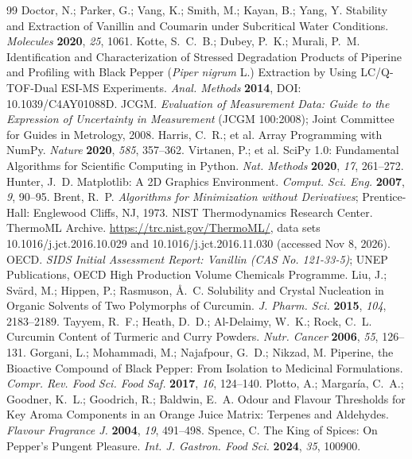 \documentclass[journal=jceaax,manuscript=article,layout=twocolumn]{achemso}
\begin{document}
\begin{thebibliography}{99}
 Doctor, N.; Parker, G.; Vang, K.; Smith, M.; Kayan, B.; Yang, Y. Stability and Extraction of Vanillin and Coumarin under Subcritical Water Conditions. \textit{Molecules} \textbf{2020}, \textit{25}, 1061.
 Kotte, S.~C.~B.; Dubey, P.~K.; Murali, P.~M. Identification and Characterization of Stressed Degradation Products of Piperine and Profiling with Black Pepper (\textit{Piper nigrum} L.) Extraction by Using LC/Q-TOF-Dual ESI-MS Experiments. \textit{Anal. Methods} \textbf{2014}, DOI: 10.1039/C4AY01088D.
 JCGM. \textit{Evaluation of Measurement Data: Guide to the Expression of Uncertainty in Measurement} (JCGM 100:2008); Joint Committee for Guides in Metrology, 2008.
 Harris, C.~R.; et al. Array Programming with NumPy. \textit{Nature} \textbf{2020}, \textit{585}, 357--362.
 Virtanen, P.; et al. SciPy 1.0: Fundamental Algorithms for Scientific Computing in Python. \textit{Nat. Methods} \textbf{2020}, \textit{17}, 261--272.
 Hunter, J.~D. Matplotlib: A 2D Graphics Environment. \textit{Comput. Sci. Eng.} \textbf{2007}, \textit{9}, 90--95.
 Brent, R.~P. \textit{Algorithms for Minimization without Derivatives}; Prentice-Hall: Englewood Cliffs, NJ, 1973.
 NIST Thermodynamics Research Center. ThermoML Archive. \url{https://trc.nist.gov/ThermoML/}, data sets 10.1016/j.jct.2016.10.029 and 10.1016/j.jct.2016.11.030 (accessed Nov 8, 2026).
 OECD. \textit{SIDS Initial Assessment Report: Vanillin (CAS No. 121-33-5)}; UNEP Publications, OECD High Production Volume Chemicals Programme.
 Liu, J.; Sv\"ard, M.; Hippen, P.; Rasmuson, \AA.~C. Solubility and Crystal Nucleation in Organic Solvents of Two Polymorphs of Curcumin. \textit{J. Pharm. Sci.} \textbf{2015}, \textit{104}, 2183--2189.
 Tayyem, R.~F.; Heath, D.~D.; Al-Delaimy, W.~K.; Rock, C.~L. Curcumin Content of Turmeric and Curry Powders. \textit{Nutr. Cancer} \textbf{2006}, \textit{55}, 126--131.
 Gorgani, L.; Mohammadi, M.; Najafpour, G.~D.; Nikzad, M. Piperine, the Bioactive Compound of Black Pepper: From Isolation to Medicinal Formulations. \textit{Compr. Rev. Food Sci. Food Saf.} \textbf{2017}, \textit{16}, 124--140.
 Plotto, A.; Margar\'ia, C.~A.; Goodner, K.~L.; Goodrich, R.; Baldwin, E.~A. Odour and Flavour Thresholds for Key Aroma Components in an Orange Juice Matrix: Terpenes and Aldehydes. \textit{Flavour Fragrance J.} \textbf{2004}, \textit{19}, 491--498.
 Spence, C. The King of Spices: On Pepper's Pungent Pleasure. \textit{Int. J. Gastron. Food Sci.} \textbf{2024}, \textit{35}, 100900.
\end{thebibliography}
\end{document}
